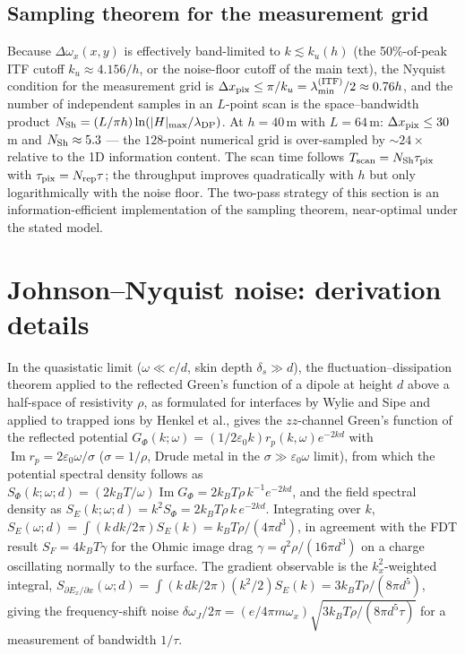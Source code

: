 \documentclass[12pt,a4paper]{article}
\begin{document}
\subsection{Sampling theorem for the measurement grid}

Because $\Delta\omega_x(x,y)$ is effectively band-limited to
$k\lesssim k_u(h)$ (the 50\%-of-peak ITF cutoff $k_u\approx4.156/h$, or the
noise-floor cutoff of the main text), the Nyquist condition for the
measurement grid is $\Delta x_{\rm pix}\le\pi/k_u
=\lambda_{\min}^{\rm(ITF)}/2\approx0.76h$, and the number of independent
samples in an $L$-point scan is the space--bandwidth product
$N_{\rm Sh}=(L/\pi h)\ln(|H|_{\max}/\lambda_{\rm DP})$.  At
$h=40$\,\textmu m with $L=64$\,\textmu m: $\Delta x_{\rm pix}\le30$\,\textmu m
and $N_{\rm Sh}\approx5.3$ --- the $128$-point numerical grid is
over-sampled by $\sim24\times$ relative to the 1D information content.
The scan time follows $T_{\rm scan}=N_{\rm Sh}\tau_{\rm pix}$ with
$\tau_{\rm pix}=N_{\rm rep}\tau$; the throughput improves quadratically
with $h$ but only logarithmically with the noise floor.  The two-pass
strategy of this section is an information-efficient implementation of
the sampling theorem, near-optimal under the stated model.

\section{Johnson--Nyquist noise: derivation details}

In the quasistatic limit ($\omega\ll c/d$, skin depth $\delta_s\gg d$), the
fluctuation--dissipation theorem applied to the reflected Green's function
of a dipole at height $d$ above a half-space of resistivity $\rho$, as
formulated for interfaces by Wylie and Sipe and applied to trapped ions by
Henkel et al., gives the $zz$-channel Green's function of the reflected
potential $G_\Phi(k;\omega)=(1/2\varepsilon_0 k)r_p(k,\omega)e^{-2kd}$ with
$\operatorname{Im} r_p = 2\varepsilon_0\omega/\sigma$ ($\sigma=1/\rho$,
Drude metal in the $\sigma\gg\varepsilon_0\omega$ limit), from which the
potential spectral density follows as
$S_\Phi(k;\omega;d)=(2k_BT/\omega)\operatorname{Im}G_\Phi
=2k_BT\rho\,k^{-1}e^{-2kd}$, and the field spectral density as
$S_E(k;\omega;d)=k^2S_\Phi=2k_BT\rho\,k\,e^{-2kd}$.  Integrating over $k$,
$S_E(\omega;d)=\int(k\,dk/2\pi)S_E(k)=k_BT\rho/(4\pi d^3)$, in agreement
with the FDT result $S_F=4k_BT\gamma$ for the Ohmic image drag
$\gamma=q^2\rho/(16\pi d^3)$ on a charge oscillating normally to the
surface.  The gradient observable is the $k_x^2$-weighted integral,
$S_{\partial E_x/\partial x}(\omega;d)=\int(k\,dk/2\pi)(k^2/2)S_E(k)
=3k_BT\rho/(8\pi d^5)$, giving the frequency-shift noise
$\delta\omega_J/2\pi=(e/4\pi m\omega_x)\sqrt{3k_BT\rho/(8\pi d^5\tau)}$
for a measurement of bandwidth $1/\tau$.
\end{document}

